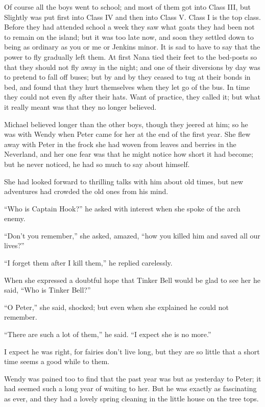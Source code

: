 Of course all the boys went to school; and most of them got into Class
III, but Slightly was put first into Class IV and then into Class V.
Class I is the top class. Before they had attended school a week they
saw what goats they had been not to remain on the island; but it was
too late now, and soon they settled down to being as ordinary as you or
me or Jenkins minor. It is sad to have to say that the power to fly
gradually left them. At first Nana tied their feet to the bed-posts so
that they should not fly away in the night; and one of their diversions
by day was to pretend to fall off buses; but by and by they ceased to
tug at their bonds in bed, and found that they hurt themselves when
they let go of the bus. In time they could not even fly after their
hats. Want of practice, they called it; but what it really meant was
that they no longer believed.

Michael believed longer than the other boys, though they jeered at him;
so he was with Wendy when Peter came for her at the end of the first
year. She flew away with Peter in the frock she had woven from leaves
and berries in the Neverland, and her one fear was that he might notice
how short it had become; but he never noticed, he had so much to say
about himself.

She had looked forward to thrilling talks with him about old times, but
new adventures had crowded the old ones from his mind.

``Who is Captain Hook?'' he asked with interest when she spoke of the
arch enemy.

``Don't you remember,'' she asked, amazed, ``how you killed him and saved
all our lives?''

``I forget them after I kill them,'' he replied carelessly.

When she expressed a doubtful hope that Tinker Bell would be glad to
see her he said, ``Who is Tinker Bell?''

``O Peter,'' she said, shocked; but even when she explained he could not
remember.

``There are such a lot of them,'' he said. ``I expect she is no more.''

I expect he was right, for fairies don't live long, but they are so
little that a short time seems a good while to them.

Wendy was pained too to find that the past year was but as yesterday to
Peter; it had seemed such a long year of waiting to her. But he was
exactly as fascinating as ever, and they had a lovely spring cleaning
in the little house on the tree tops.

